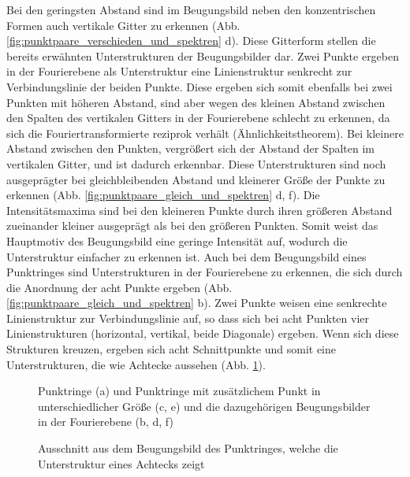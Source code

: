 Bei den geringsten Abstand sind im Beugungsbild neben den konzentrischen Formen auch vertikale Gitter zu erkennen (Abb. \ref{fig:punktpaare_verschieden_und_spektren} d). Diese Gitterform stellen die bereits erwähnten Unterstrukturen der Beugungsbilder dar. Zwei Punkte ergeben in der Fourierebene als
Unterstruktur eine Linienstruktur senkrecht zur Verbindungslinie der beiden Punkte. Diese ergeben sich somit ebenfalls bei zwei Punkten mit höheren Abstand, sind aber wegen des
kleinen Abstand zwischen den Spalten des vertikalen Gitters in der Fourierebene schlecht zu erkennen, da sich die Fouriertransformierte reziprok verhält (Ähnlichkeitstheorem). Bei
kleinere Abstand zwischen den Punkten, vergrößert sich der Abstand der Spalten im vertikalen Gitter, und ist dadurch erkennbar. Diese Unterstrukturen sind noch ausgeprägter bei gleichbleibenden Abstand und kleinerer Größe der Punkte zu erkennen (Abb. \ref{fig:punktpaare_gleich_und_spektren} d, f). Die
Intensitätsmaxima sind bei den kleineren Punkte durch ihren größeren Abstand zueinander kleiner ausgeprägt als bei den größeren Punkten. Somit weist das Hauptmotiv des Beugungsbild eine geringe Intensität auf, wodurch die Unterstruktur einfacher zu erkennen
ist.
Auch bei dem Beugungsbild eines Punktringes sind Unterstrukturen in der Fourierebene zu erkennen, die sich durch die Anordnung der acht Punkte ergeben (Abb. \ref{fig:punktpaare_gleich_und_spektren} b). Zwei Punkte weisen eine senkrechte Linienstruktur zur Verbindungslinie auf, so dass sich bei acht Punkten vier Linienstrukturen (horizontal, vertikal, beide Diagonale) ergeben. Wenn sich diese Strukturen kreuzen, ergeben sich acht Schnittpunkte und somit eine Unterstrukturen, die wie Achtecke aussehen (Abb. \ref{fig:punktringe_und_spektrum}).

\begin{figure}[h]
	\centering
	\caption[Punktringe mit Fourierspektren]{Punktringe (a) und Punktringe mit zusätzlichem Punkt in unterschiedlicher Größe (c, e) und die dazugehörigen Beugungsbilder in der Fourierebene (b, d, f)}
	\label{fig:punktringe_und_spektrum}
\end{figure}

\begin{figure}[h]
	\centering
	\caption[Punktringe Beugungsbild Ausschnitt]{Ausschnitt aus dem Beugungsbild des Punktringes, welche die Unterstruktur eines Achtecks zeigt}
	\label{fig:punktring_ausschnitt}
\end{figure}

